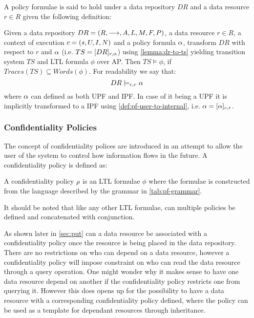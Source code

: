 A policy formulae is said to hold under a data repository $DR$ and a data resource $r \in R$ given the following definition:
\begin{definition}
Given a data repository $DR= \left( R, \longrightarrow, A, L, M, F, P \right)$, a data resource $r \in R$, a context of execution $c = \left( s, U, I, N \right)$ and a policy formula $\alpha$, transform $DR$ with respect to $r$ and $\alpha$ (i.e. $TS = [DR]_{r,\alpha}$) using \autoref{lemma:dr-to-ts} yielding transition system $TS$ and LTL formula $\phi$ over AP. Then $TS \models \phi$, if $Traces(TS) \subseteq Words(\phi)$. For readability we say that:
\begin{equation*}
    DR \models_{c,r} \alpha
\end{equation*}
where $\alpha$ can defined as both UPF and IPF. In case of it being a UPF it is implicitly transformed to a IPF using \autoref{def:pf-user-to-internal}, i.e. $\alpha = [\alpha]_{c,r}$.
\end{definition}

\subsubsection{Confidentiality Policies}
The concept of confidentiality polices are introduced in an attempt to allow the user of the system to control how information flows in the future. A confidentiality policy is defined as:
\begin{definition}\label{def:cp}
A confidentiality policy $\rho$ is an LTL formulae $\phi$ where the formulae is constructed from the language described by the grammar in \autoref{tab:pf-grammar}.
\end{definition}
It should be noted that like any other LTL formulae, can multiple policies be defined and concatenated with conjunction.

As shown later in \autoref{sec:put} can a data resource be associated with a confidentiality policy once the resource is being placed in the data repository. There are no restrictions on who can depend on a data resource, however a confidentiality policy will impose constraint on who can read the data resource through a query operation. One might wonder why it makes sense to have one data resource depend on another if the confidentiality policy restricts one from querying it. However this does opens up for the possibility to have a data resource with a corresponding confidentiality policy defined, where the policy can be used as a template for dependant resources through inheritance.

